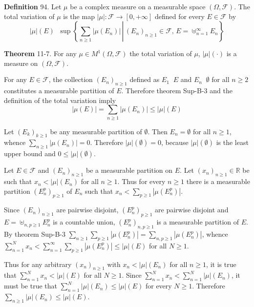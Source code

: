 \documentclass[a4paper]{article}
\newcommand{\obj}[1]{\left\{ #1 \right \}}
\newcommand{\clo}[1]{\left [ #1 \right ]}
\newcommand{\brac}[1]{\left ( #1 \right )}
\newcommand{\induc}[1]{\left . #1 \right \vert}
\newcommand{\abs}[1]{\left | #1 \right |}
\newcommand{\Real}{\mathbb{R}}
\newcommand{\Zinf}{\clo{ 0, +\infty }}
\newcommand{\Fcal}{\mathcal{F}}
\newcommand{\defn}{\mathop{\overset{\Delta}{=}}\nolimits}
\begin{document}
\noindent \textbf{Definition} 94.
Let $\mu$ be a complex measure on a measurable space $\brac{\Omega, \Fcal}$. The total variation of $\mu$ is the map $\abs{\mu}:\Fcal\to\Zinf$ defined for every $E\in \Fcal$ by \[\abs{\mu}\brac{E}\defn \sup\obj{ \induc{\sum_{n\geq 1} \abs{\mu\brac{E_n}}\,}\, \brac{E_n}_{n\geq1}\in \Fcal,\,E=\uplus_{n=1}^\infty E_n }\]

\label{thm:tot_var_is_measure} \noindent \textbf{Theorem} 11-7.
For any $\mu\in M^1\brac{\Omega, \Fcal}$ the total variation of $\mu$, $\abs{\mu}\brac{\cdot}$ is a measure on $\brac{\Omega, \Fcal}$.

For any $E\in\Fcal$, the collection $\brac{E_n}_{n\geq1}$ defined as $E_1 \defn E$ and $E_n\defn \emptyset$ for all $n\geq 2$ constitutes a measurable partition of $E$. Therefore theorem Sup-B-3 and the definition of the total variation imply \[\abs{\mu\brac{E}} = \sum_{n\geq 1} \abs{\mu\brac{E_n}} \leq \abs{\mu}\brac{E}\]

Let $\brac{E_k}_{k\geq1}$ be any measurable partition of $\emptyset$. Then $E_n=\emptyset$ for all $n\geq 1$, whence $\sum_{n\geq 1}\abs{\mu\brac{E_n}} = 0$. Therefore $\abs{\mu}\brac{\emptyset}=0$, because $\abs{\mu}\brac{\emptyset}$ is the least upper bound and $0\leq \abs{\mu}\brac{\emptyset}$.

Let $E\in \Fcal$ and $\brac{E_n}_{n\geq1}$ be a measurable partition on $E$. Let $\brac{x_n}_{n\geq 1}\in\Real$ be such that $x_n<\abs{\mu}\brac{E_n}$ for all $n\geq 1$. Thus for every $n\geq1$ there is a measurable partition $\brac{E_n^p}_{p\geq1}$ of $E_n$ such that $x_n<\sum_{p\geq 1} \abs{\mu\brac{E_n^p}}$.

Since $\brac{E_n}_{n\geq1}$ are pairwise disjoint, $\brac{E_n^p}_{p\geq1}$ are pairwise disjoint and $E=\uplus_{n,p\geq1} E_n^p$ is a countable union, $\brac{E_n^p}_{n,p\geq1}$ is a measurable partition of $E$. By theorem Sup-B-3 $\sum_{n\geq 1}\sum_{p\geq 1} \abs{\mu\brac{E_n^p}} = \sum_{n,p\geq 1} \abs{\mu\brac{E_n^p}}$, whence $\sum_{n=1}^N x_n < \sum_{n=1}^\infty\sum_{p\geq 1} \abs{\mu\brac{E_n^p}}\leq \abs{\mu}\brac{E}$ for all $N\geq 1$.

Thus for any arbitrary $\brac{x_n}_{n\geq 1}$ with $x_n<\abs{\mu}\brac{E_n}$ for all $n\geq 1$, it is true that $\sum_{n=1}^N x_n < \abs{\mu}\brac{E}$ for all $N\geq 1$. Since $\sum_{n=1}^N x_n < \sum_{n=1}^N \abs{\mu}\brac{E_n}$, it must be true that $\sum_{n=1}^N \abs{\mu}\brac{E_n}\leq \abs{\mu}\brac{E}$ for every $N\geq 1$. Therefore $\sum_{n\geq 1} \abs{\mu}\brac{E_n}\leq \abs{\mu}\brac{E}$.
\end{document}
